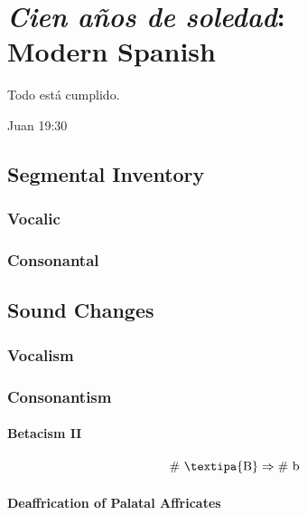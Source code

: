 \documentclass{report}[12pt]
\begin{document}
\thispagestyle{empty}

\pagebreak

\chapter{\emph{Cien a\~{n}os de soledad}: \\ Modern Spanish}

\epigraph{Todo está cumplido.}{Juan 19:30}

\section{Segmental Inventory}

\subsection{Vocalic}

\subsection{Consonantal}

\section{Sound Changes}

\subsection{Vocalism}

\subsection{Consonantism}

\subsubsection{Betacism II}\label{sec:betacism_2}

\begin{tcolorbox}
  \[ \#\ \text{\textipa{B}} \Rightarrow \#\ \text{b} \]
\end{tcolorbox}

\subsubsection{Deaffrication of Palatal Affricates}

\begin{tcolorbox}

\end{tcolorbox}
\end{document}
